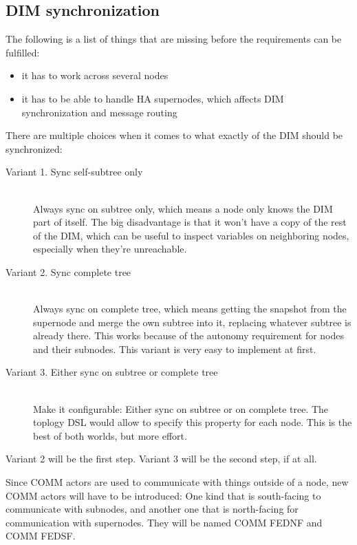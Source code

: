 \subsection{DIM synchronization}
The following is a list of things that are missing before the requirements can be fulfilled:
\begin{itemize}
\item it has to work across several nodes
\item it has to be able to handle HA supernodes, which affects DIM synchronization and message routing
\end{itemize}

There are multiple choices when it comes to what exactly of the DIM should be synchronized:

\begin{description}
	\item [Variant 1. Sync self-subtree only] \hfill\\
	Always sync on subtree only, which means a node only knows the DIM part of
	itself. The big disadvantage is that it won't have a copy of the rest of the
	DIM, which can be useful to inspect variables on neighboring nodes, especially
	when they're unreachable.

	\item [Variant 2. Sync complete tree] \hfill\\
	Always sync on complete tree, which means getting the snapshot from the
	supernode and merge the own subtree into it, replacing whatever subtree is
	already there. This works because of the autonomy requirement for nodes and
	their subnodes. This variant is very easy to implement at first.

	\item [Variant 3. Either sync on subtree or complete tree] \hfill\\
	Make it configurable: Either sync on subtree or on complete tree. The
	toplogy DSL would allow to specify this property for each node. This is
	the best of both worlds, but more effort.
\end{description}

Variant 2 will be the first step. Variant 3 will be the second step, if at all.

Since COMM actors are used to communicate with things outside of a node, new COMM
actors will have to be introduced: One kind that is south-facing to communicate
with subnodes, and another one that is north-facing for communication with
supernodes. They will be named COMM FEDNF and COMM FEDSF. %

